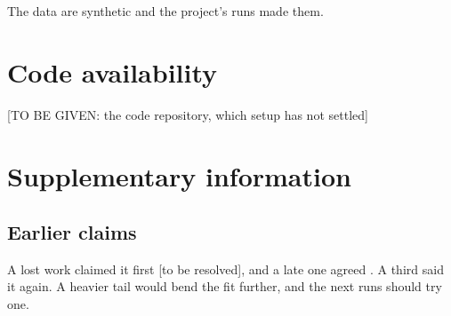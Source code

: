 \documentclass[
]{testconf}
\begin{document}
The data are synthetic and the project's runs made them.

\section{Code availability}\label{code-availability}

{[}TO BE GIVEN: the code repository, which setup has not settled{]}

\section{Supplementary information}\label{supplementary-information}

\subsection{Earlier claims}\label{supplement-earlier-claims}

A lost work claimed it first {[}to be resolved{]}, and a late one agreed
\citep{late-work}. A third said it again. A heavier tail would bend the
fit further, and the next runs should try one.


\end{document}
